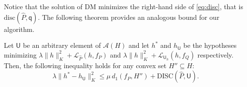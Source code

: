 \documentclass[twoside,11pt]{article}
\providecommand{\norm}[2]{\lVert#1\rVert_{#2}}
\newcommand{\h}{\widehat}
\newcommand{\cA}{{\mathcal A}}
\newcommand{\cL}{{\mathcal L}}
\newcommand{\1}{\mat{1}}
\newcommand{\qq}{{\mathsf q}}
\newcommand{\UU}{{\mathsf U}}
\newcommand{\dis}{\mathrm{disc}}
\newcommand{\DIS}{\mathrm{DISC}}
\newcommand{\done}{d_1}
\begin{document}
Notice that the solution of DM minimizes the right-hand side of
\eqref{eq:disc}, that is
$\dis(\h P, \qq)$. The following theorem provides an
analogous bound for our algorithm.

\begin{theorem}
\label{th:qhbound}
Let $\UU$ be an arbitrary element of $\cA(H)$ and let $h^*$ and $h_\UU$
be the hypotheses minimizing
$\lambda \norm{h}{K}^2 + \cL_{\h P}(h, f_P)$ and
$\lambda \norm{h}{K}^2 + \cL_{\UU_h}(h, f_Q)$
respectively. Then, the following inequality holds for any convex set
$H'' \subseteq H$:
\begin{equation}
\label{eq:qhbound}
\lambda \norm{h^* - h_\UU}{K}^2 \leq \mu \, \done(f_P, H'') +
\DIS(\h P, \UU).
\end{equation}
\end{theorem}
\end{document}
